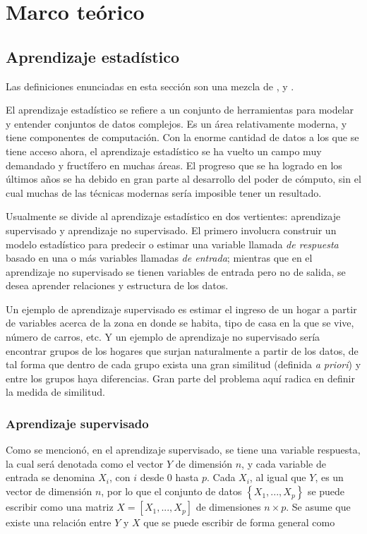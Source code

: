 
\chapter{Marco teórico}

\section{Aprendizaje estadístico}

Las definiciones enunciadas en esta sección son una mezcla de \cite{christopher2006pattern}, \cite{friedman2001elements} y \cite{james2013introduction}.

El aprendizaje estadístico se refiere a un conjunto de herramientas para modelar y entender conjuntos de datos complejos. Es un área relativamente moderna, y tiene componentes de computación. Con la enorme cantidad de datos a los que se tiene acceso ahora, el aprendizaje estadístico se ha vuelto un campo muy demandado y fructífero en muchas áreas. El progreso que se ha logrado en los últimos años se ha debido en gran parte al desarrollo del poder de cómputo, sin el cual muchas de las técnicas modernas sería imposible tener un resultado.

Usualmente se divide al aprendizaje estadístico en dos vertientes: aprendizaje supervisado y aprendizaje no supervisado. El primero involucra construir un modelo estadístico para predecir o estimar una variable llamada \textit{de respuesta} basado en una o más variables llamadas \textit{de entrada}; mientras que en el aprendizaje no supervisado se tienen variables de entrada pero no de salida, se desea aprender relaciones y estructura de los datos.

Un ejemplo de aprendizaje supervisado es estimar el ingreso de un hogar a partir de variables acerca de la zona en donde se habita, tipo de casa en la que se vive, número de carros, etc. Y un ejemplo de aprendizaje no supervisado sería encontrar grupos de los hogares que surjan naturalmente a partir de los datos, de tal forma que dentro de cada grupo exista una gran similitud (definida \textit{a priori}) y entre los grupos haya diferencias. Gran parte del problema aquí radica en definir la medida de similitud.

\subsection{Aprendizaje supervisado}

Como se mencionó, en el aprendizaje supervisado, se tiene una variable respuesta, la cual será denotada como el vector $Y$ de dimensión $n$, y cada variable de entrada se denomina $X_i$, con $i$ desde $0$ hasta $p$. Cada $X_i$, al igual que $Y$, es un vector de dimensión $n$, por lo que el conjunto de datos $\left \{ X_1, ..., X_p \right \}$ se puede escribir como una matriz  $X = \left[ X_1, ..., X_p \right ]$ de dimensiones $n \times p$. Se asume que existe una relación entre $Y$ y $X$ que se puede escribir de forma general como

